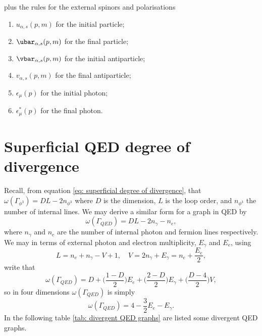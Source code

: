 plus the rules for the external spinors and polarisations
\begin{enumerate}
    \item $u_{\alpha,s}(p,m)$ for the initial particle;
    \item $\ubar_{\alpha,s}(p,m)$ for the final particle;
    \item $\vbar_{\alpha,s}(p,m)$ for the initial antiparticle;
    \item $v_{\alpha,s}(p,m)$ for the final antiparticle;
    \item $\epsilon_\mu(p)$ for the initial photon;
    \item $\epsilon_\mu^*(p)$ for the final photon.
\end{enumerate}

\section{Superficial QED degree of divergence}
Recall, from equation \eqref{eq: superficial degree of divergence}, that $\omega(\Gamma_{\phi^3}) = DL - 2n_{\phi^3}$ where $D$ is the dimension, $L$ is the loop order, and $n_{\phi^3}$ the number of internal lines. We may derive a similar form for a graph in QED by 
\begin{equation}
    \omega(\Gamma_{QED}) = DL - 2n_\gamma - n_e,
\end{equation}
where $n_\gamma$ and $n_e$ are the number of internal photon and fermion lines respectively. We may in terms of external photon and electron multiplicity, $E_\gamma$ and $E_e$, using
\begin{equation}
    L = n_e + n_\gamma - V + 1,\quad V = 2n_\gamma + E_\gamma = n_e + \frac{E_e}{2},
\end{equation}
write that 
\begin{equation}
    \omega(\Gamma_{QED}) = D + \bigg(\frac{1 - D}{2}\bigg)E_e + \bigg(\frac{2 - D}{2}\bigg)E_\gamma + \bigg(\frac{D - 4}{2}\bigg)V,
\end{equation}
so in four dimensions $\omega(\Gamma_{QED})$ is simply
\begin{equation}
    \omega(\Gamma_{QED}) = 4 - \frac{3}{2}E_e - E_\gamma.
\end{equation}
In the following table \ref{tab: divergent QED graphs} are listed some divergent QED graphs. 

